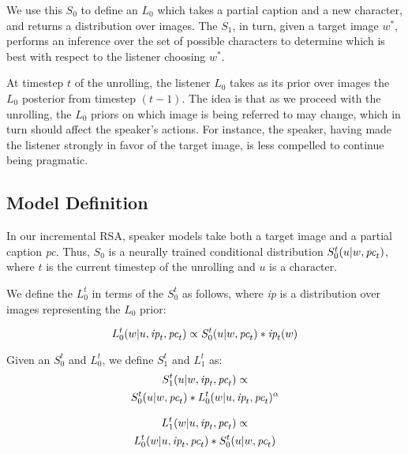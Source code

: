 \documentclass[11pt,a4paper]{article}
\begin{document}
We use this $S_0$ to define an $L_0$ which takes a partial caption and a new character, and returns a distribution over images. The $S_1$, in turn, given a target image $w^{\ast}$, performs an inference over the set of possible characters to determine which is best with respect to the listener choosing $w^{\ast}$.

At timestep $t$ of the unrolling, the listener $L_0$ takes as its prior over images the $L_0$ posterior from timestep $(t-1)$. The idea is that as we proceed with the unrolling, the $L_0$ priors on which image is being referred to may change, which in turn should affect the speaker's actions. For instance, the speaker, having made the listener strongly in favor of the target image, is less compelled to continue being pragmatic. 

\subsection{Model Definition} \label{decision2}

In our incremental RSA, speaker models take both a target image and a partial caption \emph{pc}. Thus, $S_0$ is a neurally trained conditional distribution $S_0^t(u|w,\emph{pc}_t)$, where $t$ is the current timestep of the unrolling and $u$ is a character.

We define the $L_0^{t}$ in terms of the $S_0^{t}$ as follows, where \emph{ip} is a distribution over images representing the $L_0$ prior:

\begin{equation}
L_0^t(w|u,\emph{ip}_t,\emph{pc}_t) \propto 
	S_0^t(u|w,\emph{pc}_t)  * \emph{ip}_t(w)
\end{equation}

\noindent
Given an $S_0^{t}$ and $L_0^{t}$, we define $S_1^{t}$ and $L_1^{t}$ as:
%
\begin{multline}
S_1^t(u|w,\emph{ip}_t,\emph{pc}_t) \propto \\
	S_{0}^t(u|w,\emph{pc}_t) * 		
    L_{0}^t(w|u,\emph{ip}_t,\emph{pc}_t)^{\alpha}
\end{multline}

\vspace{-20pt}

\begin{multline}
L_1^t(w|u,\emph{ip}_t,\emph{pc}_t) \propto  \\
	L_{0}^t(w|u,\emph{ip}_t,\emph{pc}_t) * 
    S_{0}^t(u|w,\emph{pc}_t)
\end{multline}
\end{document}
